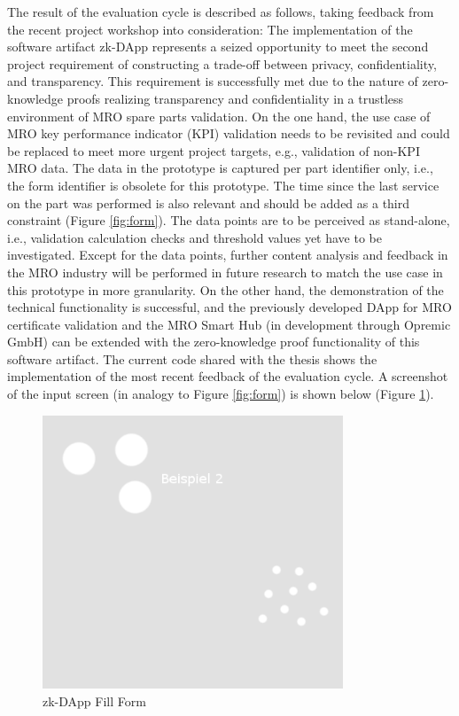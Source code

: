 The result of the evaluation cycle is described as follows, taking feedback from the recent project workshop into consideration: The implementation of the software artifact zk-DApp represents a seized opportunity to meet the second project requirement of constructing a trade-off between privacy, confidentiality, and transparency. This requirement is successfully met due to the nature of zero-knowledge proofs realizing transparency and confidentiality in a trustless environment of MRO spare parts validation. On the one hand, the use case of MRO key performance indicator (KPI) validation needs to be revisited and could be replaced to meet more urgent project targets, e.g., validation of non-KPI MRO data. The data in the prototype is captured per part identifier only, i.e., the form identifier is obsolete for this prototype. The time since the last service on the part was performed is also relevant and should be added as a third constraint (Figure \ref{fig:form}). The data points are to be perceived as stand-alone, i.e., validation calculation checks and threshold values yet have to be investigated. Except for the data points, further content analysis and feedback in the MRO industry will be performed in future research to match the use case in this prototype in more granularity. On the other hand, the demonstration of the technical functionality is successful, and the previously developed DApp for MRO certificate validation and the MRO Smart Hub (in development through Opremic GmbH) can be extended with the zero-knowledge proof functionality of this software artifact. The current code shared with the thesis shows the implementation of the most recent feedback of the evaluation cycle. A screenshot of the input screen (in analogy to Figure \ref{fig:form}) is shown below (Figure \ref{fig:form1}).
\begin{figure}[hbt]
	\centering
		\includegraphics[width=0.8\textwidth]{Pictures/bsp2.png}
	\caption{zk-DApp Fill Form}
	\label{fig:form1}
\end{figure}
